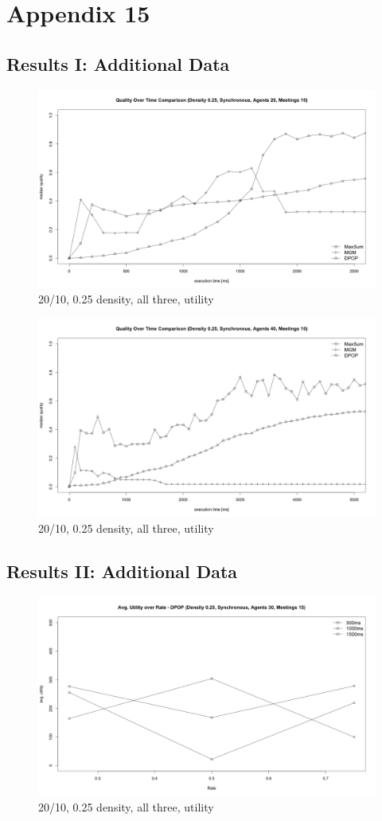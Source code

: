 \chapter{Appendix 15}
\label{a:appendix}

\section{Results I: Additional Data}

\begin{figure}[h]
\centering
\includegraphics[width=430px]{graphics/experiments/static/st_2}
\caption{20/10, 0.25 density, all three, utility}
\label{fig:st_2}
\end{figure}

\begin{figure}[h]
\centering
\includegraphics[width=430px]{graphics/experiments/static/st_4}
\caption{20/10, 0.25 density, all three, utility}
\label{fig:st_3}
\end{figure}

\section{Results II: Additional Data}

\begin{figure}[h]
\centering
\includegraphics[width=430px]{graphics/experiments/dynamic/d_6}
\caption{20/10, 0.25 density, all three, utility}
\label{fig:d_6}
\end{figure}